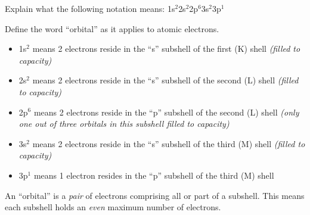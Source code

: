 
Explain what the following notation means: 1s$^{2}$2s$^{2}$2p$^{6}$3s$^{2}$3p$^{1}$

\vskip 10pt

Define the word ``orbital'' as it applies to atomic electrons.






\begin{itemize}
\item{} 1s$^{2}$ means 2 electrons reside in the ``s'' subshell of the first (K) shell {\it (filled to capacity)}
\item{} 2s$^{2}$ means 2 electrons reside in the ``s'' subshell of the second (L) shell {\it (filled to capacity)}
\item{} 2p$^{6}$ means 2 electrons reside in the ``p'' subshell of the second (L) shell {\it (only one out of three orbitals in this subshell filled to capacity)}
\item{} 3s$^{2}$ means 2 electrons reside in the ``s'' subshell of the third (M) shell {\it (filled to capacity)}
\item{} 3p$^{1}$ means 1 electron resides in the ``p'' subshell of the third (M) shell
\end{itemize}

\vskip 10pt

An ``orbital'' is a {\it pair} of electrons comprising all or part of a subshell.  This means each subshell holds an {\it even} maximum number of electrons.











